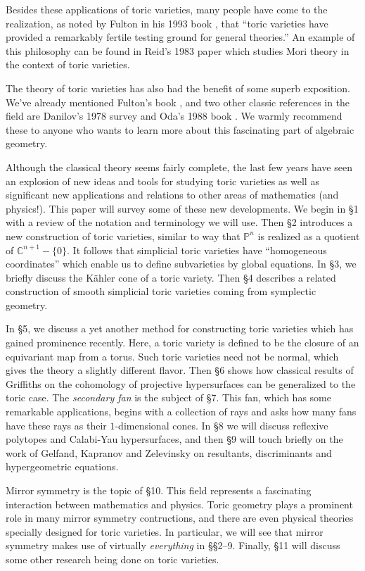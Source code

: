 \documentclass{amsart}
\theoremstyle{plain}
\theoremstyle{definition}
\begin{document}
	Besides these applications of toric varieties, many people
have come to the realization, as noted by Fulton in his 1993 book
\cite{Ful}, that ``toric varieties have provided a remarkably fertile
testing ground for general theories.''  An example of this philosophy
can be found in Reid's 1983 paper \cite{Rei2} which studies Mori theory
in the context of toric varieties.

	The theory of toric varieties has also had the benefit of some
superb exposition.  We've already mentioned Fulton's book \cite{Ful},
and two other classic references in the field are Danilov's 1978
survey \cite{Dan2} and Oda's 1988 book \cite{Oda2}.  We warmly recommend
these to anyone who wants to learn more about this fascinating part of
algebraic geometry.

	Although the classical theory seems fairly complete, the last
few years have seen an explosion of new ideas and tools for studying
toric varieties as well as significant new applications and relations
to other areas of mathematics (and physics!).  This paper will survey
some of these new developments.  We begin in \S1 with a review of the
notation and terminology we will use.  Then \S2 introduces a new
construction of toric varieties, similar to way that $\mathbb{P}^n$ is
realized as a quotient of $\mathbb{C}^{n+1}-\{0\}$.  It follows that
simplicial toric varieties have ``homogeneous coordinates'' which
enable us to define subvarieties by global equations.  In \S3, we
briefly discuss the K\"ahler cone of a toric variety.  Then \S4
describes a related construction of smooth simplicial toric varieties
coming from symplectic geometry.

	In \S5, we discuss a yet another method for constructing toric
varieties which has gained prominence recently.  Here, a toric variety
is defined to be the closure of an equivariant map from a torus.  Such
toric varieties need not be normal, which gives the theory a slightly
different flavor.  Then \S6 shows how classical results of Griffiths
on the cohomology of projective hypersurfaces can be generalized to
the toric case.  The {\it secondary fan\/} is the subject of \S7.
This fan, which has some remarkable applications, begins with a
collection of rays and asks how many fans have these rays as their
$1$-dimensional cones.  In \S8 we will discuss reflexive polytopes and
Calabi-Yau hypersurfaces, and then \S9 will touch briefly on the work
of Gelfand, Kapranov and Zelevinsky on resultants, discriminants and
hypergeometric equations.

	Mirror symmetry is the topic of \S10.  This field represents a
fascinating interaction between mathematics and physics.  Toric
geometry plays a prominent role in many mirror symmetry contructions,
and there are even physical theories specially designed for toric
varieties.  In particular, we will see that mirror symmetry makes use
of virtually {\it everything\/} in \S\S2--9.  Finally, \S11 will
discuss some other research being done on toric varieties.
\end{document}
